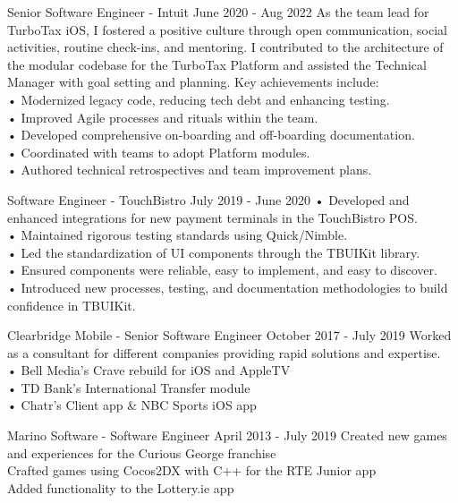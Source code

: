 \documentclass[
	10pt, %
]{FreemanCV}
\begin{document}
\begin{paracol}{2}

\jobentry
	{Senior Software Engineer - Intuit}
	{June 2020 - Aug 2022}
	{As the team lead for TurboTax iOS, I fostered a positive culture through open communication, social activities, routine check-ins, and mentoring. I contributed to the architecture of the modular codebase for the TurboTax Platform and assisted the Technical Manager with goal setting and planning. Key achievements include:\medskip\\
    • Modernized legacy code, reducing tech debt and enhancing testing.\\
    • Improved Agile processes and rituals within the team.\\
    • Developed comprehensive on-boarding and off-boarding documentation.\\
    • Coordinated with teams to adopt Platform modules.\\
    • Authored technical retrospectives and team improvement plans.}


\jobentry
	{Software Engineer - TouchBistro}
    {July 2019 - June 2020}
    {• Developed and enhanced integrations for new payment terminals in the TouchBistro POS.\\
    • Maintained rigorous testing standards using Quick/Nimble.\\
    • Led the standardization of UI components through the TBUIKit library.\\
    • Ensured components were reliable, easy to implement, and easy to discover.\\
    • Introduced new processes, testing, and documentation methodologies to build confidence in TBUIKit.}


\jobentry
    {Clearbridge Mobile - Senior Software Engineer}
    {October 2017 - July 2019}
    {Worked as a consultant for different companies providing rapid solutions and expertise.\\
    • Bell Media's Crave rebuild for iOS and AppleTV\\
    • TD Bank's International Transfer module\\
    • Chatr's Client app \& NBC Sports iOS app}
    


\jobentry
    {Marino Software - Software Engineer}
    {April 2013 - July 2019}
    {Created new games and experiences for the Curious George franchise\\
    Crafted games using Cocos2DX with C++ for the RTE Junior app\\
    Added functionality to the Lottery.ie app}


\end{paracol}
\end{document}
